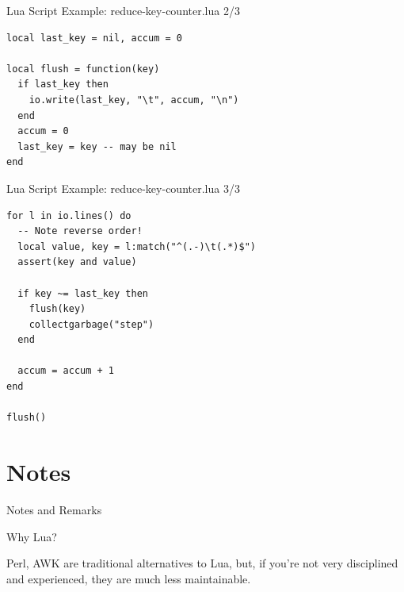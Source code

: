 \documentclass[handout]{beamer}
\begin{document}
\begin{frame}[fragile]{Lua Script Example: reduce-key-counter.lua 2/3}

\begin{verbatim}
local last_key = nil, accum = 0

local flush = function(key)
  if last_key then
    io.write(last_key, "\t", accum, "\n")
  end
  accum = 0
  last_key = key -- may be nil
end
\end{verbatim}

\end{frame}


\begin{frame}[fragile]{Lua Script Example: reduce-key-counter.lua 3/3}

\begin{verbatim}
for l in io.lines() do
  -- Note reverse order!
  local value, key = l:match("^(.-)\t(.*)$")
  assert(key and value)

  if key ~= last_key then
    flush(key)
    collectgarbage("step")
  end

  accum = accum + 1
end

flush()
\end{verbatim}

\end{frame}


\section{Notes}


\begin{frame}
\huge Notes and Remarks
\end{frame}


\begin{frame}{Why Lua?}

Perl, AWK are traditional alternatives to Lua,
but, if you're not very disciplined and experienced,
they are much less maintainable.

\end{frame}
\end{document}

